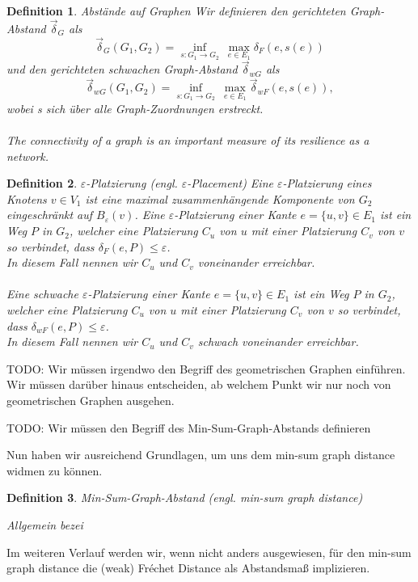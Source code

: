 \documentclass[a4paper, 12pt, twoside]{article}
\theoremstyle{Format1} %
\newtheorem{Def}{Definition}[section]       %
\begin{document}
\begin{Def}
	Abstände auf Graphen
	Wir definieren den \textit{gerichteten Graph-Abstand} $ \vec{\delta}_G $ als
	$$ \vec{\delta}_G(G_1,G_2) = \inf_{s: G_1 \to G_2} \: \max_{e \in E_1} \delta_F(e, s(e)) $$
	und den \textit{gerichteten schwachen Graph-Abstand} $ \vec{\delta}_{wG} $ als
	$$  \vec{\delta}_{wG}(G_1,G_2) = \inf_{s: G_1 \to G_2} \: \max_{e \in E_1} \vec{\delta}_{wF}(e, s(e)), $$
	wobei s sich über alle Graph-Zuordnungen erstreckt.
	\\
	\\The connectivity of a graph is an important measure of its resilience as a network.
\end{Def}

\begin{Def}
	$\varepsilon$-Platzierung (engl. $\varepsilon$-Placement)
	Eine \textit{$\varepsilon$-Platzierung eines Knotens $v \in V_1$} ist eine maximal zusammenhängende Komponente von $G_2$ eingeschränkt auf $B_{\varepsilon}(v)$.
	Eine \textit{$\varepsilon$-Platzierung einer Kante $e = \{u,v\} \in E_1$} ist ein Weg $P$ in $G_2$, welcher eine Platzierung $C_u$ von $u$ mit einer Platzierung $C_v$ von $v$
	so verbindet, dass $\delta_F(e, P) \leq \varepsilon$.
	\\
	In diesem Fall nennen wir $C_u$ und $C_v$ \textit{voneinander erreichbar}.
	\\
	\\
	Eine schwache $\varepsilon$-Platzierung einer Kante $e = \{u,v\} \in E_1$ ist ein Weg $P$ in $G_2$, welcher eine Platzierung $C_u$ von $u$ mit einer Platzierung $C_v$ von $v$
	so verbindet, dass $\delta_{wF}(e, P) \leq \varepsilon$.
	\\
	In diesem Fall nennen wir $C_u$ und $C_v$ \textit{schwach voneinander erreichbar}.

\end{Def}

TODO: Wir müssen irgendwo den Begriff des geometrischen Graphen einführen.
Wir müssen darüber hinaus entscheiden, ab welchem Punkt wir nur noch von geometrischen Graphen ausgehen.

TODO: Wir müssen den Begriff des Min-Sum-Graph-Abstands definieren

\newpage
Nun haben wir ausreichend Grundlagen, um uns dem min-sum graph distance widmen zu können.
\begin{Def}
	Min-Sum-Graph-Abstand (engl. min-sum graph distance)

	Allgemein bezei

\end{Def}
Im weiteren Verlauf werden wir, wenn nicht anders ausgewiesen, für den min-sum graph distance die (weak) Fréchet Distance als Abstandsmaß implizieren.
\end{document}
